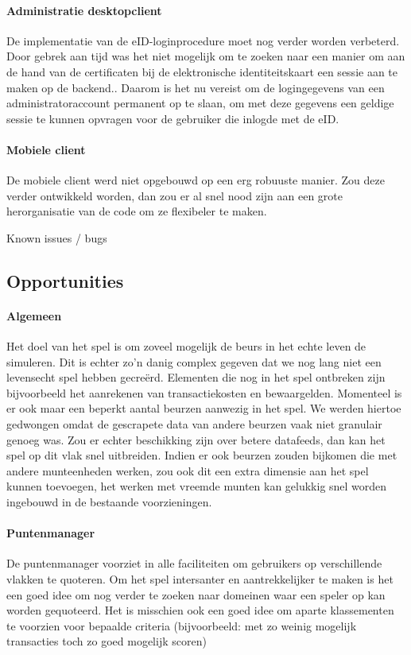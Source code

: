 \paragraph{Administratie desktopclient} De implementatie van de eID-loginprocedure moet nog verder worden verbeterd.  Door gebrek aan tijd was het niet mogelijk om te zoeken naar een manier om aan de hand van de certificaten bij de elektronische identiteitskaart een sessie aan te maken op de backend.. Daarom is het nu vereist om de logingegevens van een administratoraccount permanent op te slaan, om met deze gegevens een geldige sessie te kunnen opvragen voor de gebruiker die inlogde met de eID.

\paragraph{Mobiele client} De mobiele client werd niet opgebouwd op een erg robuuste manier. Zou deze verder ontwikkeld worden, dan zou er al snel nood zijn aan een grote herorganisatie van de code om ze flexibeler te maken.

\todo Known issues / bugs

\subsection{Opportunities}

\paragraph{Algemeen} Het doel van het spel is om zoveel mogelijk de beurs in het echte leven de simuleren. Dit is echter zo'n danig complex gegeven dat we nog lang niet een levensecht spel hebben gecre\"erd. Elementen die nog in het spel ontbreken zijn bijvoorbeeld het aanrekenen van transactiekosten en bewaargelden. 
Momenteel is er ook maar een beperkt aantal beurzen aanwezig in het spel. We werden hiertoe gedwongen omdat de gescrapete data van andere beurzen vaak niet granulair genoeg was. Zou er echter beschikking zijn over betere datafeeds, dan kan het spel op dit vlak snel uitbreiden. Indien er ook beurzen zouden bijkomen die met andere munteenheden werken, zou ook dit een extra dimensie aan het spel kunnen toevoegen, het werken met vreemde munten kan gelukkig snel worden ingebouwd in de bestaande voorzieningen.

\paragraph{Puntenmanager} De puntenmanager voorziet in alle faciliteiten om gebruikers op verschillende vlakken te quoteren. Om het spel intersanter en aantrekkelijker te maken is het een goed idee om nog verder te zoeken naar domeinen waar een speler op kan worden gequoteerd. Het is misschien ook een goed idee om aparte klassementen te voorzien voor bepaalde criteria (bijvoorbeeld: met zo weinig mogelijk transacties toch zo goed mogelijk scoren)

